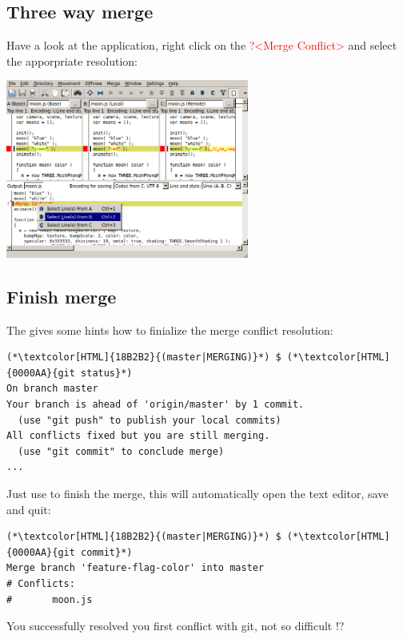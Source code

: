 \subsection{Three way merge}
\begin{frame}[fragile]
    \subslidetitle
  Have a look at the  application, right click on the \textcolor{red}{?<Merge Conflict>} and select the apporpriate resolution:
  \newline \vspace{1em}
  \centerline{\includegraphics[width=8cm]{../screen/git-mergetool-kdiff3-resolve.png}}

\end{frame}

\subsection{Finish merge}
\begin{frame}[fragile]
    \subslidetitle
  The  gives some hints how to finialize the merge conflict resolution:
  \begin{lstlisting}
(*\textcolor[HTML]{18B2B2}{(master|MERGING)}*) $ (*\textcolor[HTML]{0000AA}{git status}*)
On branch master
Your branch is ahead of 'origin/master' by 1 commit.
  (use "git push" to publish your local commits)
All conflicts fixed but you are still merging.
  (use "git commit" to conclude merge)
...
\end{lstlisting}

  Just use  to finish the merge, this will automatically open the text editor, save and quit:
  \begin{lstlisting}
(*\textcolor[HTML]{18B2B2}{(master|MERGING)}*) $ (*\textcolor[HTML]{0000AA}{git commit}*)
Merge branch 'feature-flag-color' into master
# Conflicts:
#       moon.js
\end{lstlisting}
  You successfully resolved you first conflict with git, not so difficult !?

\end{frame}

